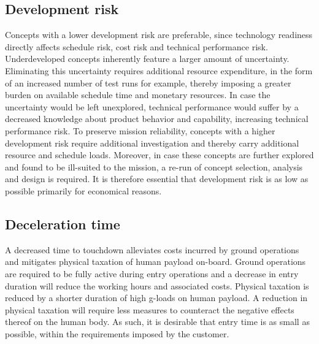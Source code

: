 \subsection{Development risk}
Concepts with a lower development risk are preferable, since technology readiness directly affects schedule risk, cost risk and technical performance risk. Underdeveloped concepts inherently feature a larger amount of uncertainty. Eliminating this uncertainty requires additional resource expenditure, in the form of an increased number of test runs for example, thereby imposing a greater burden on available schedule time and monetary resources. In case the uncertainty would be left unexplored, technical performance would suffer by a decreased knowledge about product behavior and capability, increasing technical performance risk. To preserve mission reliability, concepts with a higher development risk require additional investigation and thereby carry additional resource and schedule loads. Moreover, in case these concepts are further explored and found to be ill-suited to the mission, a re-run of concept selection, analysis and design is required. It is therefore essential that development risk is as low as possible primarily for economical reasons.

\subsection{Deceleration time}
A decreased time to touchdown alleviates costs incurred by ground operations and mitigates physical taxation of human payload on-board. Ground operations are required to be fully active during entry operations and a decrease in entry duration will reduce the working hours and associated costs. Physical taxation is reduced by a shorter duration of high g-loads on human payload. A reduction in physical taxation will require less measures to counteract the negative effects thereof on the human body. As such, it is desirable that entry time is as small as possible, within the requirements imposed by the customer.


